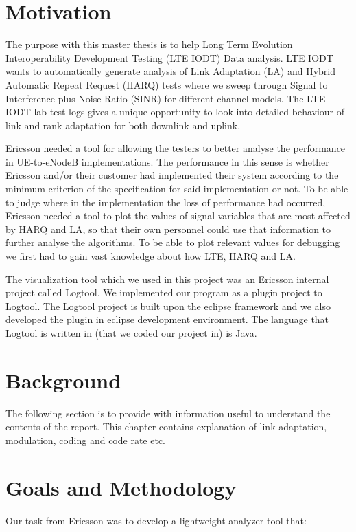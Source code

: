 \documentclass[cropmarks, frame, english]{idamasterthesis}
\begin{document}
\newpage
\section{Motivation}
The purpose with this master thesis is to help Long Term Evolution Interoperability Development Testing (LTE IODT) Data analysis. LTE IODT wants to automatically generate analysis of Link Adaptation (LA) and Hybrid Automatic Repeat Request (HARQ) tests where we sweep through Signal to Interference plus Noise Ratio (SINR) for different channel models. The LTE IODT lab test logs gives a unique opportunity to look into detailed behaviour of link and rank adaptation for both downlink and uplink. \newline


Ericsson needed a tool for allowing the testers to better analyse the performance in UE-to-eNodeB implementations. The performance in this sense is whether Ericsson and/or their customer had implemented their system according to the minimum criterion of the specification for said implementation or not. To be able to judge where in the implementation the loss of performance had occurred, Ericsson needed a tool to plot the values of signal-variables that are most affected by HARQ and LA, so that their own personnel could use that information to further analyse the algorithms. To be able to plot relevant values for debugging we first had to gain vast knowledge about how LTE, HARQ and LA. \newline


The visualization tool which we used in this project was an Ericsson internal project called Logtool. We implemented our program as a plugin project to Logtool. The Logtool project is built upon the eclipse framework and we also developed the plugin in eclipse development environment. The language that Logtool is written in (that we coded our project in) is Java. 
\section{Background}
The following section is to provide with information useful to understand the contents of the report. This chapter contains explanation of link adaptation, modulation, coding and code rate etc.


\section{Goals and Methodology}

Our task from Ericsson was to develop a lightweight analyzer tool that:
\end{document}
